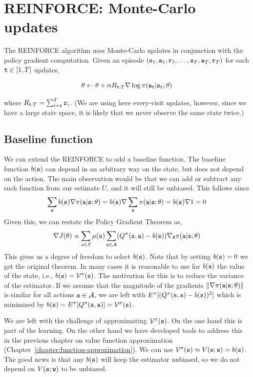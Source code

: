 \section{REINFORCE: Monte-Carlo updates}

The REINFORCE algorithm uses Monte-Carlo updates in conjunction
with the policy gradient computation. Given an episode
$({\tt s}_1,{\tt a}_1,{\tt r}_1, \ldots ,
{\tt s}_T,{\tt a}_T,{\tt r}_T)$ for each ${\tt t}\in [1,T]$ updates,

\[
\theta\leftarrow \theta+\alpha R_{{\tt t}:T} \nabla \log
\pi({\tt a}_{\tt t}|{\tt s}_{\tt t};\theta)
\]

where $R_{{\tt t}:T}=\sum_{i={\tt t}}^T {\tt r}_i$. (We are using here
every-visit updates, however, since we have a large state space, it
is likely that we never observe the same state twice.)


\subsection*{Baseline function}
We can extend the REINFORCE to add a baseline function.
The baseline function $b({\tt s})$ can depend in an arbitrary way on
the state, but does not depend on the action. The main observation
would be that we can add or subtract any such function from our
estimate $U$, and it will still be unbiased. This follows since
\[
\sum_{\tt a} b({\tt s}) \nabla
\pi({\tt a}|{\tt s};\theta)=b({\tt s})\nabla \sum_{\tt a}
\pi({\tt a}|{\tt s};\theta)=b({\tt s})\nabla 1=0
\]
Given this, we can restate the Policy Gradient Theorem as,
\[
\nabla J(\theta)\propto \sum_{s\in S} \mu({\tt s}) \sum_{{\tt a}\in
\mathcal{A}} (Q^\pi ({\tt s},{\tt a})-b({\tt s}))\nabla_\theta
\pi({\tt a}|{\tt s};\theta)
\]
This gives us a degree of freedom to select $b({\tt s})$. Note that
by setting $b({\tt s})=0$ we get the original theorem. In many cases
it is reasonable to use for $b({\tt s})$ the value of the state,
i.e., $b({\tt s})=\mathcal{V}^\pi({\tt s})$. The motivation for this is
to reduce the variance of the estimator. If we assume that the
magnitude of the gradients $\|\nabla
\pi({\tt a}|{\tt s};\theta)\|$ is similar for all actions
${\tt a}\in \mathcal{A}$, we are left with $E^\pi
[(Q^\pi({\tt s},{\tt a})-b({\tt s}))^2]$ which is minimized by
$b({\tt s})=E^\pi[Q^\pi({\tt s},{\tt a})]=\mathcal{V}^\pi({\tt s})$.

We are left with the challenge of approximating
$\mathcal{V}^\pi({\tt s})$. On the one hand this is part of the
learning. On the other hand we have developed tools to address this
in the previous chapter on value function approximation (Chapter~\ref{chapter:function-approximation}). We can use
$\mathcal{V}^\pi({\tt s})\approx V({\tt s};{\tt w})=b({\tt s})$. The
good news is that any $b({\tt s})$ will keep the estimator unbiased,
so we do not depend on $V({\tt s};{\tt w})$ to be unbiased.

